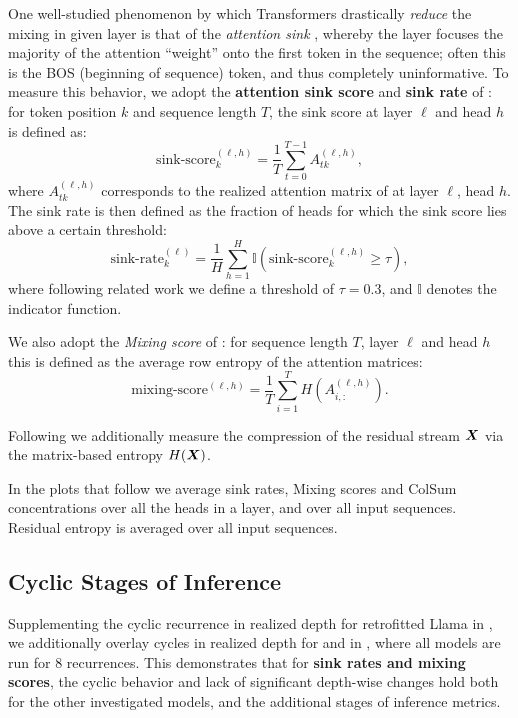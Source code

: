 One well-studied phenomenon by which Transformers drastically \emph{reduce} the mixing in given layer is that of the \emph{attention sink} \citep{xiao2023efficient,barbero2025llms}, whereby the layer focuses the majority of the attention ``weight'' onto the first token in the sequence; often this is the BOS (beginning of sequence) token, and thus completely uninformative. To measure this behavior, we adopt the \textbf{attention sink score} and \textbf{sink rate} of \citet{gu2024attention}: for token position $k$ and sequence length $T$, the sink score at layer $\ell$ and head $h$ is defined as:
\begin{equation}
    \text{sink-score}_k^{(\ell,h)} = \frac{1}{T}\sum_{t=0}^{T-1}A_{tk}^{(\ell,h)},
\end{equation}
where $A_{tk}^{(\ell,h)}$ corresponds to the realized attention matrix of  at layer $\ell$, head $h$. The sink rate is then defined as the fraction of heads for which the sink score lies above a certain threshold:
\begin{equation}
    \text{sink-rate}^{(\ell)}_k = \frac{1}{H}\sum_{h=1}^H\mathbb{I}\!\left(\text{sink-score}_k^{(\ell,h)}\geq \tau\right),
\end{equation}
where following related work we define a threshold of $\tau=0.3$, and $\mathbb{I}$ denotes the indicator function.

We also adopt the \emph{Mixing score} of \citet{queipo2025attention}: for sequence length $T$, layer $\ell$ and head $h$ this is defined as the average row entropy of the attention matrices:
\begin{equation}
    \text{mixing-score}^{(\ell,h)} = \frac{1}{T} \sum_{i=1}^T H(A_{i, :}^{(\ell, h)}).
\end{equation}

Following \citet{skean2025layer,queipo2025attention} we additionally measure the compression of the residual stream ${\bm{X}}$ via the matrix-based entropy $H({\bm{X}})$.

In the plots that follow we average sink rates, Mixing scores and ColSum concentrations over all the heads in a layer, and over all input sequences. Residual entropy is averaged over all input sequences.

\FloatBarrier
\subsection{Cyclic Stages of Inference}\label{appen:cyclic_soi}

Supplementing the cyclic recurrence in realized depth for retrofitted Llama in , we additionally overlay cycles in realized depth for \ouro{} and \raven{} in , where all models are run for 8 recurrences. This demonstrates that for \textbf{sink rates and mixing scores}, the cyclic behavior and lack of significant depth-wise changes hold both for the other investigated models, and the additional stages of inference metrics.

